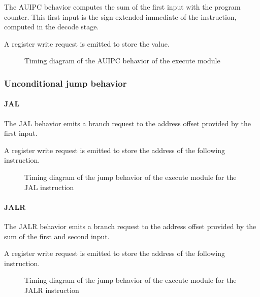 \begin{content}
    The AUIPC behavior computes the sum of the first input with the program counter. This first input is the sign-extended immediate of the instruction, computed in the decode stage.
    
    A register write request is emitted to store the value.
\end{content}

\begin{figure}[H]
    \centering
    
    \caption{Timing diagram of the AUIPC behavior of the execute module}
    \label{fig:exm-behavior-auipc}
\end{figure}

\subsubsection{Unconditional jump behavior}

\paragraph{JAL}

\begin{content}
    The JAL behavior emits a branch request to the address offset provided by the first input.
    
    A register write request is emitted to store the address of the following instruction.
\end{content}

\begin{figure}[H]
    \centering
    
    \caption{Timing diagram of the jump behavior of the execute module for the JAL instruction}
    \label{fig:exm-behavior-jump-jal}
\end{figure}

\paragraph{JALR}

\begin{content}
    The JALR behavior emits a branch request to the address offset provided by the sum of the first and second input.
    
    A register write request is emitted to store the address of the following instruction.
\end{content}

\begin{figure}[H]
    \centering
    
    \caption{Timing diagram of the jump behavior of the execute module for the JALR instruction}
    \label{fig:exm-behavior-jump-jalr}
\end{figure}

